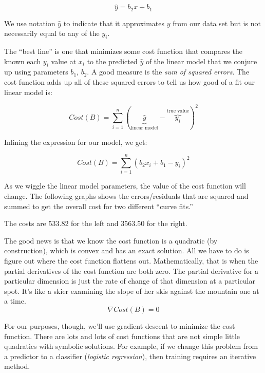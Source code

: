\documentclass[titlepage]{tufte-book}
\newcounter{problem}
\begin{document}
\begin{fullwidth}
\[
\hat{y} = b_2 x + b_1
\]

\noindent We use notation $\hat{y}$ to indicate that it approximates $y$ from our data set but is not necessarily equal to any of the $y_i$.

The ``best line'' is one that minimizes some cost function that compares the known each $y_i$ value at $x_i$ to the predicted $\hat{y}$ of the linear model that we conjure up using parameters $b_1$, $b_2$. A good measure is the {\em sum of squared errors}. The cost function adds up all of these squared errors to tell us how good of a fit our linear model is:

\[
Cost(B) = \sum_{i=1}^{n}(\underbrace{\hat{y}}_\text{linear model} - \overbrace{y_i}^\text{true value})^2
\]

\noindent Inlining the expression for our model, we get:

\[
Cost(B) = \sum_{i=1}^{n}(b_2 x_i + b_1 - y_i)^2
\]

\noindent As we wiggle the linear model parameters, the value of the cost function will change.  The following graphs shows the errors/residuals that are squared and summed to get the overall cost for two different ``curve fits.''

\begin{center}
\end{center}

\noindent The costs are 533.82 for the left and 3563.50 for the right.

The good news is that we know the cost function is a quadratic (by construction), which is convex and has an exact solution. All we have to do is figure out where the cost function flattens out. Mathematically, that is when the partial derivatives of the cost function are both zero. The partial derivative for a particular dimension is just the rate of change of that dimension at a particular spot. It's like a skier examining the slope of her skis against the mountain one at a time.
\[\tag{Analytic solution to optimization}
\nabla Cost(B) = 0
\]

\noindent For our purposes, though, we'll use gradient descent to minimize the cost function. There are lots and lots of cost functions that are not simple little quadratics with symbolic solutions.  For example, if we change this problem from a predictor to a classifier ({\em logistic regression}), then training requires an iterative method.


\end{fullwidth}
\end{document}
